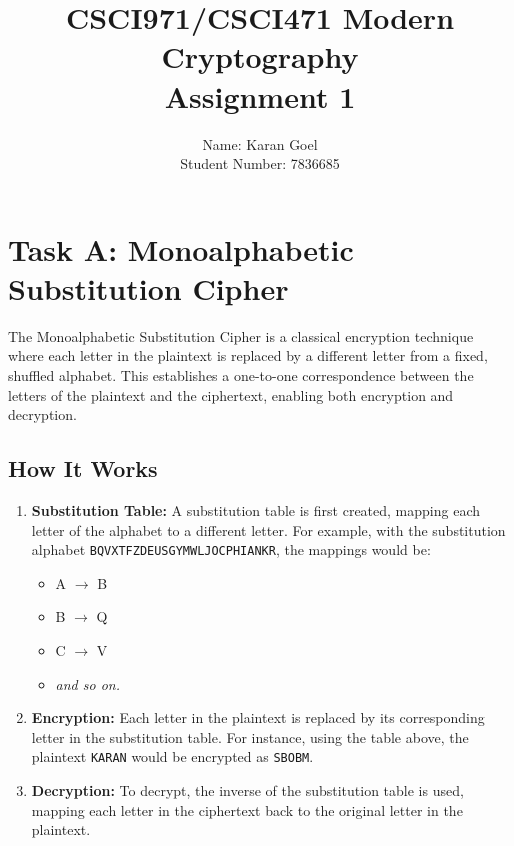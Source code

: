 \documentclass[12pt]{article}
\begin{document}
\title{
    CSCI971/CSCI471 Modern Cryptography \\
    Assignment 1 \\}


\author{
Name: Karan Goel \\
Student Number: 7836685
}

\maketitle



\section{Task A: Monoalphabetic Substitution Cipher}

The Monoalphabetic Substitution Cipher is a classical encryption technique where each letter in the plaintext is replaced by a different letter from a fixed, shuffled alphabet. This establishes a one-to-one correspondence between the letters of the plaintext and the ciphertext, enabling both encryption and decryption.

\subsection*{How It Works}

\begin{enumerate}
    \item \textbf{Substitution Table:} A substitution table is first created, mapping each letter of the alphabet to a different letter. For example, with the substitution alphabet \texttt{BQVXTFZDEUSGYMWLJOCPHIANKR}, the mappings would be:
    \begin{itemize}
        \item A $\rightarrow$ B
        \item B $\rightarrow$ Q
        \item C $\rightarrow$ V
        \item \textit{and so on.}
    \end{itemize}
    
    \item \textbf{Encryption:} Each letter in the plaintext is replaced by its corresponding letter in the substitution table. For instance, using the table above, the plaintext \texttt{KARAN} would be encrypted as \texttt{SBOBM}.
    
    \item \textbf{Decryption:} To decrypt, the inverse of the substitution table is used, mapping each letter in the ciphertext back to the original letter in the plaintext.
\end{enumerate}
\end{document}
